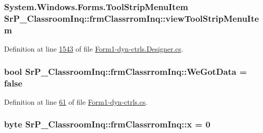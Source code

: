 \hypertarget{class_sr_p___classroom_inq_1_1frm_classrrom_inq_a703cf9f48d3d8aa2b88e8d9490600c54}{
\subsubsection[{view\-Tool\-Strip\-Menu\-Item}]{\setlength{\rightskip}{0pt plus 5cm}\-System.\-Windows.\-Forms.\-Tool\-Strip\-Menu\-Item {\bf \-Sr\-P\-\_\-\-Classroom\-Inq\-::frm\-Classrrom\-Inq\-::view\-Tool\-Strip\-Menu\-Item}}}
\label{class_sr_p___classroom_inq_1_1frm_classrrom_inq_a703cf9f48d3d8aa2b88e8d9490600c54}


\-Definition at line \hyperlink{_form1-dyn-ctrls_8_designer_8cs_source_l01543}{1543} of file \hyperlink{_form1-dyn-ctrls_8_designer_8cs_source}{\-Form1-\/dyn-\/ctrls.\-Designer.\-cs}.

\hypertarget{class_sr_p___classroom_inq_1_1frm_classrrom_inq_a44eb31e84ef4705e39c15c4d6047807e}{
\subsubsection[{\-We\-Got\-Data}]{\setlength{\rightskip}{0pt plus 5cm}bool {\bf \-Sr\-P\-\_\-\-Classroom\-Inq\-::frm\-Classrrom\-Inq\-::\-We\-Got\-Data} = false}}
\label{class_sr_p___classroom_inq_1_1frm_classrrom_inq_a44eb31e84ef4705e39c15c4d6047807e}


\-Definition at line \hyperlink{_form1-dyn-ctrls_8cs_source_l00061}{61} of file \hyperlink{_form1-dyn-ctrls_8cs_source}{\-Form1-\/dyn-\/ctrls.\-cs}.

\hypertarget{class_sr_p___classroom_inq_1_1frm_classrrom_inq_ab6836b7a465c2251301a02d9da5c3c31}{
\subsubsection[{x}]{\setlength{\rightskip}{0pt plus 5cm}byte {\bf \-Sr\-P\-\_\-\-Classroom\-Inq\-::frm\-Classrrom\-Inq\-::x} = 0}}
\label{class_sr_p___classroom_inq_1_1frm_classrrom_inq_ab6836b7a465c2251301a02d9da5c3c31}


